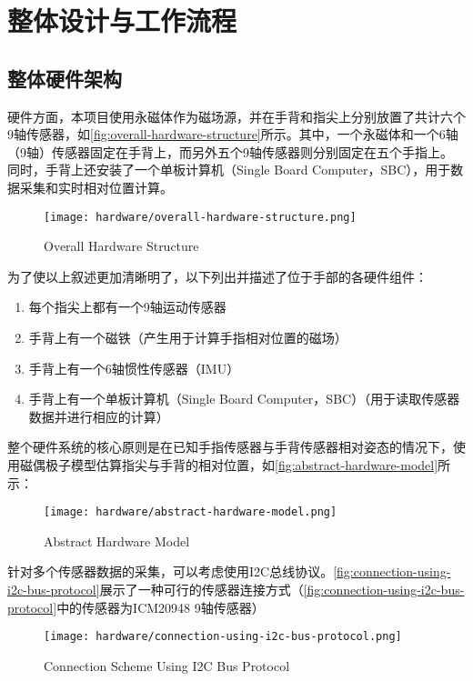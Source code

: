 \cleardoublepage

\section{整体设计与工作流程}
\subsection{整体硬件架构}

硬件方面，本项目使用永磁体作为磁场源，并在手背和指尖上分别放置了共计六个9轴传感器，如\autoref{fig:overall-hardware-structure}所示。其中，一个永磁体和一个6轴（9轴）传感器固定在手背上，而另外五个9轴传感器则分别固定在五个手指上。
同时，手背上还安装了一个单板计算机（Single Board Computer，SBC），用于数据采集和实时相对位置计算。
\begin{figure}[H]
    \centering
    \texttt{[image: hardware/overall-hardware-structure.png]}
    \caption{\label{fig:overall-hardware-structure}Overall Hardware Structure}
\end{figure}

为了使以上叙述更加清晰明了，以下列出并描述了位于手部的各硬件组件：
\begin{enumerate}
\item 每个指尖上都有一个9轴运动传感器
\item 手背上有一个磁铁（产生用于计算手指相对位置的磁场）
\item 手背上有一个6轴惯性传感器（IMU）
\item 手背上有一个单板计算机（Single Board Computer，SBC）（用于读取传感器数据并进行相应的计算）
\end{enumerate}

整个硬件系统的核心原则是在已知手指传感器与手背传感器相对姿态的情况下，使用磁偶极子模型估算指尖与手背的相对位置，如\autoref{fig:abstract-hardware-model}所示：

\begin{figure}[H]
    \centering
    \texttt{[image: hardware/abstract-hardware-model.png]}
    \caption{\label{fig:abstract-hardware-model}Abstract Hardware Model}
\end{figure}

针对多个传感器数据的采集，可以考虑使用I2C总线协议。\autoref{fig:connection-using-i2c-bus-protocol}展示了一种可行的传感器连接方式（\autoref{fig:connection-using-i2c-bus-protocol}中的传感器为ICM20948 9轴传感器）

\begin{figure}[H]
    \centering
    \texttt{[image: hardware/connection-using-i2c-bus-protocol.png]}
    \caption{\label{fig:connection-using-i2c-bus-protocol}Connection Scheme Using I2C Bus Protocol}
\end{figure}

